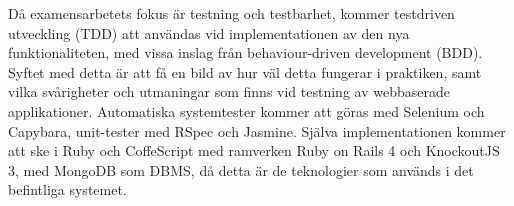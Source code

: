Då examensarbetets fokus är testning och testbarhet, kommer testdriven
utveckling (TDD) att användas vid implementationen av den nya
funktionaliteten, med vissa inslag från behaviour-driven development
(BDD). Syftet med detta är att få en bild av hur väl detta fungerar i
praktiken, samt vilka svårigheter och utmaningar som finns vid testning
av webbaserade applikationer. Automatiska systemtester kommer att göras
med Selenium och Capybara, unit-tester med RSpec och Jasmine. Själva
implementationen kommer att ske i Ruby och CoffeScript med ramverken
Ruby on Rails 4 och KnockoutJS 3, med MongoDB som DBMS, då detta är de
teknologier som används i det befintliga systemet.\\

